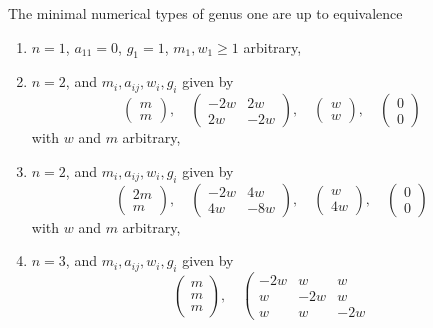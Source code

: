 \begin{lemma}
\label{lemma-genus-one}
The minimal numerical types of genus one are up to equivalence
\begin{enumerate}
\item
\label{item-one}
$n = 1$, $a_{11} = 0$, $g_1 = 1$, $m_1, w_1 \geq 1$ arbitrary,
\item
\label{item-two-cycle}
$n = 2$, and $m_i, a_{ij}, w_i, g_i$ given by
$$
\left(
\begin{matrix}
m \\
m
\end{matrix}
\right),
\quad
\left(
\begin{matrix}
-2w & 2w \\
2w & -2w
\end{matrix}
\right),
\quad
\left(
\begin{matrix}
w \\
w
\end{matrix}
\right),
\quad
\left(
\begin{matrix}
0 \\
0
\end{matrix}
\right)
$$
with $w$ and $m$ arbitrary,
\item
\label{item-up4}
$n = 2$, and $m_i, a_{ij}, w_i, g_i$ given by
$$
\left(
\begin{matrix}
2m \\
m
\end{matrix}
\right),
\quad
\left(
\begin{matrix}
-2w & 4w \\
4w & -8w
\end{matrix}
\right),
\quad
\left(
\begin{matrix}
w \\
4w
\end{matrix}
\right),
\quad
\left(
\begin{matrix}
0 \\
0
\end{matrix}
\right)
$$
with $w$ and $m$ arbitrary,
\item
\label{item-three-cycle}
$n = 3$, and $m_i, a_{ij}, w_i, g_i$ given by
$$
\left(
\begin{matrix}
m \\
m \\
m
\end{matrix}
\right),
\quad
\left(
\begin{matrix}
-2w & w & w \\
w & -2w & w \\
w & w & -2w
\end{matrix}
$$
\end{enumerate}
\end{lemma}
